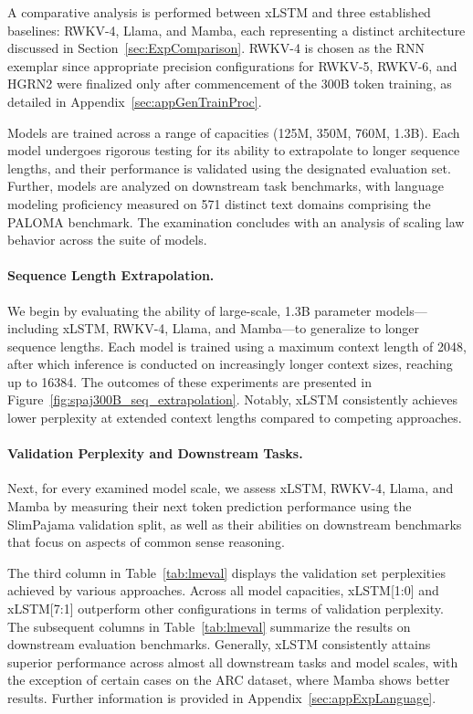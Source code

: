 A comparative analysis is performed between xLSTM and three established baselines: RWKV-4, Llama, and Mamba, each representing a distinct architecture discussed in Section~\ref{sec:ExpComparison}. RWKV-4 is chosen as the RNN exemplar since appropriate precision configurations for RWKV-5, RWKV-6, and HGRN2 were finalized only after commencement of the 300B token training, as detailed in Appendix~\ref{sec:appGenTrainProc}. 

Models are trained across a range of capacities (125M, 350M, 760M, 1.3B). Each model undergoes rigorous testing for its ability to extrapolate to longer sequence lengths, and their performance is validated using the designated evaluation set. Further, models are analyzed on downstream task benchmarks, with language modeling proficiency measured on 571 distinct text domains comprising the PALOMA benchmark. The examination concludes with an analysis of scaling law behavior across the suite of models.

\paragraph{Sequence Length Extrapolation.}
\label{sec:spaj300B_ctx_extrapolation}
We begin by evaluating the ability of large-scale, 1.3B parameter models—including xLSTM, RWKV-4, Llama, and Mamba—to generalize to longer sequence lengths. Each model is trained using a maximum context length of 2048, after which inference is conducted on increasingly longer context sizes, reaching up to 16384. The outcomes of these experiments are presented in Figure~\ref{fig:spaj300B_seq_extrapolation}. Notably, xLSTM consistently achieves lower perplexity at extended context lengths compared to competing approaches.

\paragraph{Validation Perplexity and Downstream Tasks.}
\label{sec:spaj_downstream_eval}
Next, for every examined model scale, we assess xLSTM, RWKV-4, Llama, and Mamba by measuring their next token prediction performance using the SlimPajama validation split, as well as their abilities on downstream benchmarks that focus on aspects of common sense reasoning.

The third column in Table~\ref{tab:lmeval} displays the validation set perplexities achieved by various approaches. Across all model capacities, xLSTM[1:0] and xLSTM[7:1] outperform other configurations in terms of validation perplexity. The subsequent columns in Table~\ref{tab:lmeval} summarize the results on downstream evaluation benchmarks. Generally, xLSTM consistently attains superior performance across almost all downstream tasks and model scales, with the exception of certain cases on the ARC dataset, where Mamba shows better results. Further information is provided in Appendix~\ref{sec:appExpLanguage}.

